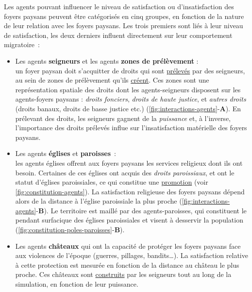 Les agents pouvant influencer le niveau de satisfaction ou d'insatisfaction des foyers paysans peuvent être catégorisés en cinq groupes, en fonction de la nature de leur relation avec les foyers paysans.
Les trois premiers sont liés à leur niveau de satisfaction, les deux derniers influent directement sur leur comportement migratoire :
\begin{itemize}
	\item Les agents \og \textbf{seigneurs}\fg{} et les agents \og \textbf{zones de prélèvement}\fg{} : \\
	un foyer paysan doit s'acquitter de droits qui sont \ul{prélevés} par des seigneurs, au sein de zones de prélèvement qu'ils \ul{créent}.
	Ces zones sont une représentation spatiale des droits dont les agents-seigneurs disposent sur les agents-foyers paysans :
		\textit{droits fonciers}, \textit{droits de haute justice}, et \textit{autres droits} (droits banaux, droits de basse justice etc.) (\cref{fig:interactions-agents}-\textbf{A}).
	En prélevant des droits, les seigneurs gagnent de la \textit{puissance} et, à l'inverse, l'importance des droits prélevés influe sur l'insatisfaction matérielle des foyers paysans.
	
	\item Les agents \og \textbf{églises}\fg{} et \og \textbf{paroisses}\fg{} : \\
	les agents \og églises\fg{} offrent aux foyers paysans les services religieux dont ils ont besoin.
	Certaines de ces églises ont acquis des \textit{droits paroissiaux}, et ont le statut d'églises paroissiales, ce qui constitue une \ul{promotion} (voir \cref{fig:constitution-agents}).
	La satisfaction religieuse des foyers paysans dépend alors de la distance à l'église paroissiale la plus proche (\cref{fig:interactions-agents}-\textbf{B}).
	Le territoire est maillé par des agents-paroisses, qui constituent le pendant surfacique des églises paroissiales et visent à desservir la population (\cref{fig:constitution-poles-paroisses}-\textbf{B}).
	
	\item Les agents \og \textbf{châteaux}\fg{} qui ont la capacité de protéger les foyers paysans face aux violences de l'époque (guerres, pillages, bandits\ldots).
	La satisfaction relative à cette protection est mesurée en fonction de la distance au château le plus proche.
	Ces châteaux sont \ul{construits} par les seigneurs tout au long de la simulation, en fonction de leur puissance.
	

\end{itemize}
